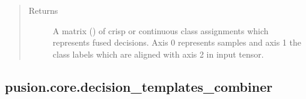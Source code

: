 \documentclass[letterpaper,10pt,english]{sphinxmanual}
\begin{document}
\begin{fulllineitems}
\begin{fulllineitems}
\begin{quote}
\begin{description}
\item[{Returns}] \leavevmode
\sphinxAtStartPar
A matrix () of crisp or continuous class assignments which represents fused decisions.
Axis 0 represents samples and axis 1 the class labels which are aligned with axis 2 in
 input tensor.

\end{description}\end{quote}

\end{fulllineitems}


\end{fulllineitems}



\subsection{pusion.core.decision\_templates\_combiner}
\label{\detokenize{pusion.core.decision_templates_combiner:module-pusion.core.decision_templates_combiner}}\label{\detokenize{pusion.core.decision_templates_combiner:pusion-core-decision-templates-combiner}}\label{\detokenize{pusion.core.decision_templates_combiner:dt-cref}}\label{\detokenize{pusion.core.decision_templates_combiner::doc}}
\end{document}
